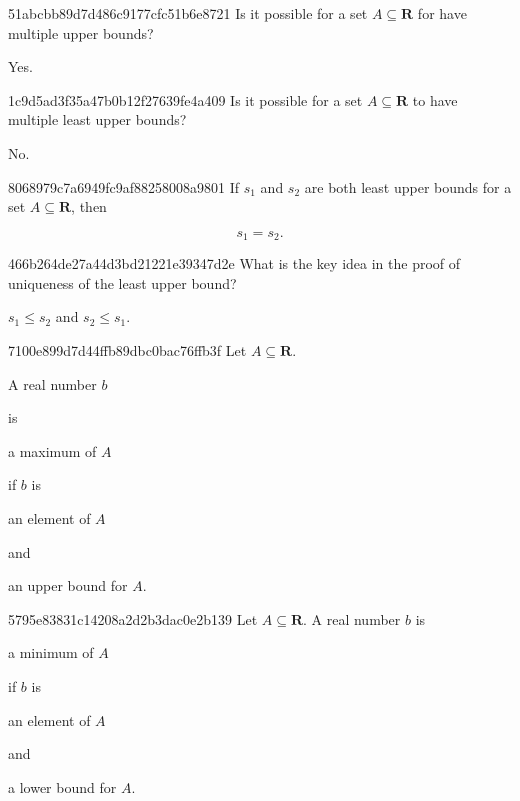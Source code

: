 \begin{note}{51abcbb89d7d486c9177cfc51b6e8721}
    Is it possible for a set \({ A \subseteq \mathbf{R} }\) for have multiple upper bounds?

    \begin{cloze}{1}
        Yes.
    \end{cloze}
\end{note}

\begin{note}{1c9d5ad3f35a47b0b12f27639fe4a409}
    Is it possible for a set \({ A \subseteq \mathbf{R} }\) to have multiple least upper bounds?

    \begin{cloze}{1}
        No.
    \end{cloze}
\end{note}

\begin{note}{8068979c7a6949fc9af88258008a9801}
    If \({ s_1 }\) and \({ s_2 }\) are both least upper bounds for a set \({ A \subseteq \mathbf{R} }\), then
    \begin{icloze}{1}
        \[
            s_1 = s_2.
        \]
    \end{icloze}
\end{note}

\begin{note}{466b264de27a44d3bd21221e39347d2e}
    What is the key idea in the proof of uniqueness of the least upper bound?

    \begin{cloze}{1}
        \({ s_1 \leq s_2 }\) and \({ s_2 \leq s_1 }\).
    \end{cloze}
\end{note}

\begin{note}{7100e899d7d44ffb89dbc0bac76ffb3f}
    Let \({ A \subseteq \mathbf{R} }\). \begin{icloze}{4}A real number \({ b }\)\end{icloze} is \begin{icloze}{3}a maximum of \({ A }\)\end{icloze} if \({ b }\) is \begin{icloze}{2}an element of \({ A }\)\end{icloze} and \begin{icloze}{1}an upper bound for \({ A }\).\end{icloze}
\end{note}

\begin{note}{5795e83831c14208a2d2b3dac0e2b139}
    Let \({ A \subseteq \mathbf{R} }\). A real number \({ b }\) is \begin{icloze}{3}a minimum of \({ A }\)\end{icloze} if \({ b }\) is \begin{icloze}{2}an element of \({ A }\)\end{icloze} and \begin{icloze}{1}a lower bound for \({ A }\).\end{icloze}
\end{note}

